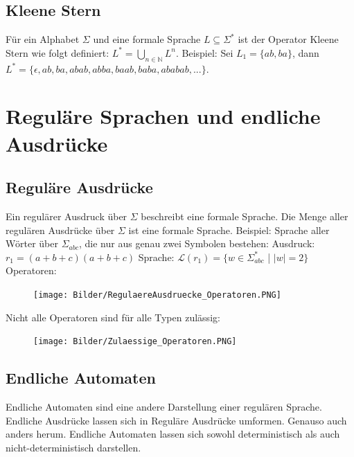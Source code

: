 \documentclass[12pt,a4paper]{article}
\begin{document}
\subsection{Kleene Stern}
Für ein Alphabet $\varSigma$ und eine formale Sprache $L \subseteq \varSigma^*$ ist der Operator Kleene Stern wie folgt definiert: $L^* = \underset{n \in \mathbb{N}}{\bigcup} L^n$.\newline \newline
Beispiel: Sei $L_1 = \{ ab, ba\}$, dann $L^* = \{\epsilon, ab, ba, abab, abba, baab, baba, ababab, ...\}$.

\section{Reguläre Sprachen und endliche Ausdrücke}
\subsection{Reguläre Ausdrücke}
Ein regulärer Ausdruck über $\varSigma$ beschreibt eine formale Sprache.\newline
Die Menge aller regulären Ausdrücke über $\varSigma$ ist eine formale Sprache.\newline\newline
Beispiel: Sprache aller Wörter über $\varSigma_{abc}$, die nur aus genau zwei Symbolen bestehen:\newline
Ausdruck: $r_1 = (a + b + c)(a + b + c)$\newline
Sprache: $\mathcal{L}(r_1) = \{ w \in \varSigma_{abc}^*$ | $|w| = 2\}$\newpage
\noindent Operatoren:
\begin{center}
	\begin{figure}[!h]
		\texttt{[image: Bilder/RegulaereAusdruecke\_Operatoren.PNG]}
	\end{figure}
\end{center}
Nicht alle Operatoren sind für alle Typen zulässig:
\begin{center}
	\begin{figure}[!h]
		\texttt{[image: Bilder/Zulaessige\_Operatoren.PNG]}
	\end{figure}
\end{center}

\subsection{Endliche Automaten}
Endliche Automaten sind eine andere Darstellung einer regulären Sprache. Endliche Ausdrücke lassen sich in Reguläre Ausdrücke umformen. Genauso auch anders herum.\newline
Endliche Automaten lassen sich sowohl deterministisch als auch nicht-deterministisch darstellen.
\end{document}
